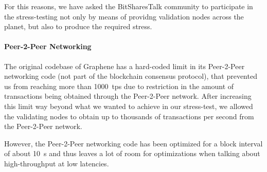 For this reasons, we have asked the BitSharesTalk community to participate in
the stress-testing not only by means of providng validation nodes across the
planet, but also to produce the required stress.

\paragraph{Peer-2-Peer Networking}
The original codebase of Graphene has a hard-coded limit in its Peer-2-Peer
networking code (not part of the blockchain consensus protocol), that prevented
us from reaching more than \SI{1000}{tps} due to restriction in the amount of
transactions being obtained through the Peer-2-Peer network. After increasing
this limit way beyond what we wanted to achieve in our stress-test, we allowed
the validating nodes to obtain up to thousands of transactions per second from the
Peer-2-Peer network.

However, the Peer-2-Peer networking code has been optimized for a block
interval of about \SI{10}{s} and thus leaves a lot of room for optimizations
when talking about high-throughput at low latencies.

